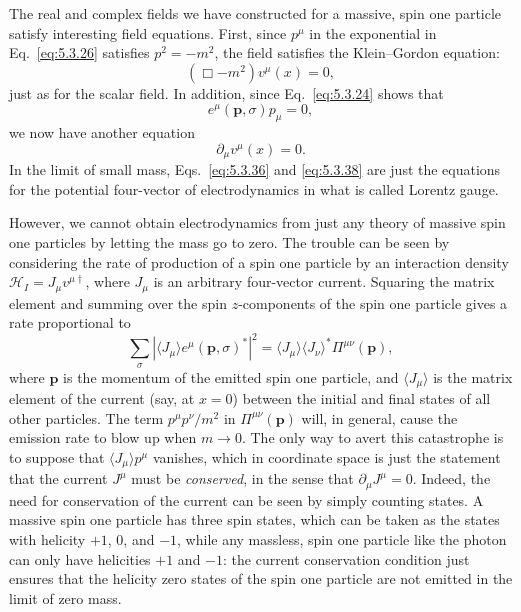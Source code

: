 The real and complex fields we have constructed for a massive, spin one
particle satisfy interesting field equations. First, since $p^\mu$ in the
exponential in Eq.~\eqref{eq:5.3.26} satisfies $p^2=-m^2$, the field satisfies the
Klein--Gordon equation:
\begin{equation}
  (\Box-m^2)v^\mu(x)=0,
  \tag{5.3.36}\label{eq:5.3.36}
\end{equation}
just as for the scalar field. In addition, since Eq.~\eqref{eq:5.3.24} shows that
\begin{equation}
  e^\mu(\mathbf{p},\sigma)p_\mu=0,
  \tag{5.3.37}\label{eq:5.3.37}
\end{equation}
we now have another equation
\begin{equation}
  \partial_\mu v^\mu(x)=0.
  \tag{5.3.38}\label{eq:5.3.38}
\end{equation}
In the limit of small mass, Eqs.~\eqref{eq:5.3.36} and \eqref{eq:5.3.38} are just the equations
for the potential four-vector of electrodynamics in what is called Lorentz
gauge.

However, we cannot obtain electrodynamics from just any theory of massive
spin one particles by letting the mass go to zero. The trouble can be seen by
considering the rate of production of a spin one particle by an interaction
density $\mathcal{H}_I=J_\mu v^{\mu\dagger}$, where $J_\mu$ is an arbitrary
four-vector current. Squaring the matrix element and summing over the spin
$z$-components of the spin one particle gives a rate proportional to
\[
  \sum_\sigma|\langle J_\mu\rangle e^\mu(\mathbf{p},\sigma)^*|^2
  =\langle J_\mu\rangle\langle J_\nu\rangle^*\Pi^{\mu\nu}(\mathbf{p}),
\]
where $\mathbf{p}$ is the momentum of the emitted spin one particle, and
$\langle J_\mu\rangle$ is the matrix element of the current (say, at $x=0$)
between the initial and final states of all other particles. The term
$p^\mu p^\nu/m^2$ in $\Pi^{\mu\nu}(\mathbf{p})$ will, in general, cause the
emission rate to blow up when $m\to0$. The only way to avert this catastrophe
is to suppose that $\langle J_\mu\rangle p^\mu$ vanishes, which in coordinate
space is just the statement that the current $J^\mu$ must be \textit{conserved},
in the sense that $\partial_\mu J^\mu=0$. Indeed, the need for conservation of
the current can be seen by simply counting states. A massive spin one particle
has three spin states, which can be taken as the states with helicity $+1$, 0,
and $-1$, while any massless, spin one particle like the photon can only have
helicities $+1$ and $-1$: the current conservation condition just ensures that
the helicity zero states of the spin one particle are not emitted in the limit
of zero mass.

